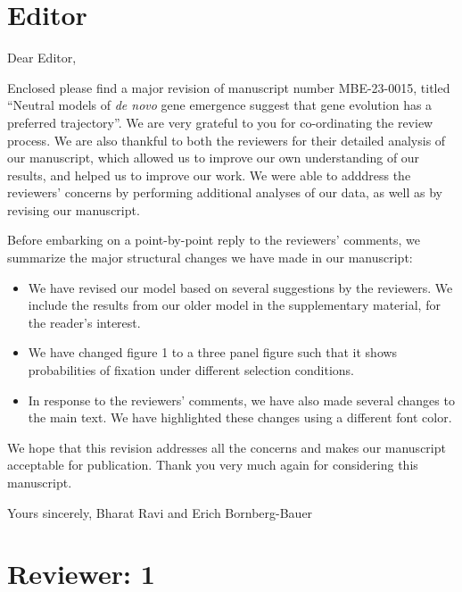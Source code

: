 \documentclass[12pt,a4paper]{article}
\begin{document}
\onehalfspacing 

\section*{Editor}

Dear Editor,

Enclosed please find a major revision of manuscript number MBE-23-0015, titled ``Neutral models of \textit{de novo} gene emergence suggest that gene evolution has a preferred trajectory''. We are very grateful to you for co-ordinating the review process. We are also thankful to both the reviewers for their detailed analysis of our manuscript, which allowed us to improve our own understanding of our results, and helped us to improve our work. We were able to adddress the reviewers' concerns by performing additional analyses of our data, as well as by revising our manuscript. 

Before embarking on a point-by-point reply to the reviewers' comments, we summarize the major structural changes we have made in our manuscript:

\begin{itemize}
\item We have revised our model based on several suggestions by the reviewers. We include the results from our older model in the supplementary material, for the reader's interest. 
\item We have changed figure 1 to a three panel figure such that it shows probabilities of fixation under different selection conditions.
\item In response to the reviewers' comments, we have also made several changes to the main text. We have highlighted these changes using a different font color.
\end{itemize}

We hope that this revision addresses all the concerns and makes our manuscript acceptable for publication. Thank you very much again for considering this manuscript.

Yours sincerely,
Bharat Ravi and Erich Bornberg-Bauer

\section*{Reviewer: 1}
\end{document}
